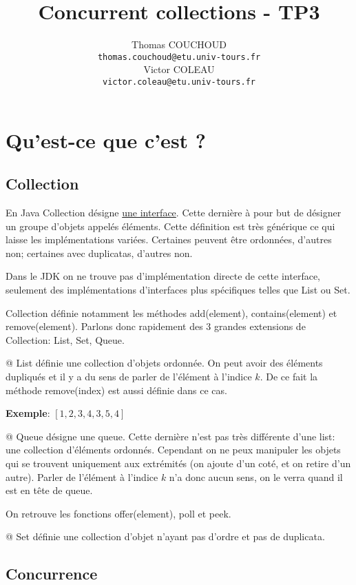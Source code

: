 \documentclass{report}
\title{Concurrent collections - TP3}
\author{Thomas COUCHOUD\\\texttt{thomas.couchoud@etu.univ-tours.fr}\\Victor COLEAU\\\texttt{victor.coleau@etu.univ-tours.fr}}
\begin{document}
	\mccTitle
	
	\chapter{Qu'est-ce que c'est ?}
		\section{Collection}
			En Java Collection désigne \href{https://docs.oracle.com/javase/8/docs/api/java/util/Collection.html}{une interface}.
			Cette dernière à pour but de désigner un groupe d'objets appelés éléments.
			Cette définition est très générique ce qui laisse les implémentations variées.
			Certaines peuvent être ordonnées, d'autres non; certaines avec duplicatas, d'autres non.
			
			Dans le JDK on ne trouve pas d'implémentation directe de cette interface, seulement des implémentations d'interfaces plus spécifiques telles que List ou Set.
			
			
			
			Collection définie notamment les méthodes add(element), contains(element) et remove(element).
			Parlons donc rapidement des 3 grandes extensions de Collection: List, Set, Queue.
			\begin{easylist}[itemize]
				@ List définie une collection d'objets ordonnée.
				On peut avoir des éléments dupliqués et il y a du sens de parler de l'élément à l'indice $k$.
				De ce fait la méthode remove(index) est aussi définie dans ce cas.
			
				\textbf{Exemple}: $\left[1,2,3,4,3,5,4\right]$
				
				@ Queue désigne une queue. Cette dernière n'est pas très différente d'une list: une collection d'éléments ordonnés.
				Cependant on ne peux manipuler les objets qui se trouvent uniquement aux extrémités (on ajoute d'un coté, et on retire d'un autre).
				Parler de l'élément à l'indice $k$ n'a donc aucun sens, on le verra quand il est en tête de queue.
				
				On retrouve les fonctions offer(element), poll et peek.
				
				@ Set définie une collection d'objet n'ayant pas d'ordre et pas de duplicata.
			\end{easylist}
			
		\section{Concurrence}
			
			
\end{document}

